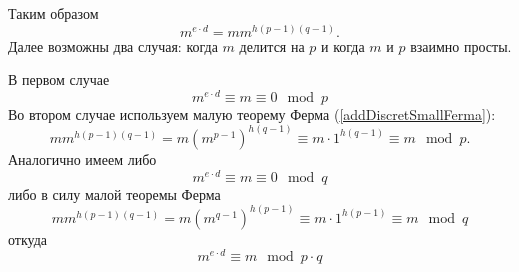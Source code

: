 Таким образом
\[
m^{e\cdot d} =m m^{h \left(p - 1\right)\left(q - 1\right)}.
\]
Далее возможны два случая: когда $m$ делится на $p$ и когда $m$ и $p$
взаимно просты.

В первом случае 
\[
m^{e\cdot d} \equiv m \equiv 0 \mod{p}
\]
Во втором случае используем малую теорему Ферма
(\ref{addDiscretSmallFerma}):
\[
m m^{h \left(p - 1\right)\left(q - 1\right)} 
= m \left(m^{p - 1}\right)^{h \left(q - 1\right)} \equiv m \cdot 1^{h
  \left(q - 1\right)} \equiv m \mod{p}.
\]
Аналогично имеем либо
\[
m^{e\cdot d} \equiv m \equiv 0 \mod{q}
\]
либо в силу малой теоремы Ферма
\[
m m^{h \left(p - 1\right)\left(q - 1\right)} 
= m \left(m^{q - 1}\right)^{h \left(p - 1\right)} \equiv m \cdot 1^{h
  \left(p - 1\right)} \equiv m \mod{q}
\]
откуда
\[
m^{e\cdot d} \equiv m \mod{p \cdot q}
\]
